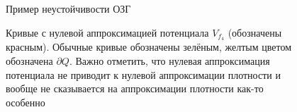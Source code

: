\documentclass[a4paper, 12pt]{article}
\begin{document}
\begin{figure}[h] 
  \vfill 
  \caption{Пример неустойчивости ОЗГ} 
  \label{ris:image1} 
\end{figure}

\begin{figure}[h!]
  \noindent{}
  \caption{Кривые с нулевой аппроксимацией потенциала $V_{f_4}$ (обозначены красным). Обычные кривые обозначены зелёным, желтым цветом обозначена $\partial Q$. Важно отметить, что нулевая аппроксимация потенциала не приводит к нулевой аппроксимации плотности и вообще не сказывается на аппроксимации плотности как-то особенно}
  \label{nolnol}
  \end{figure} 
\end{document}
